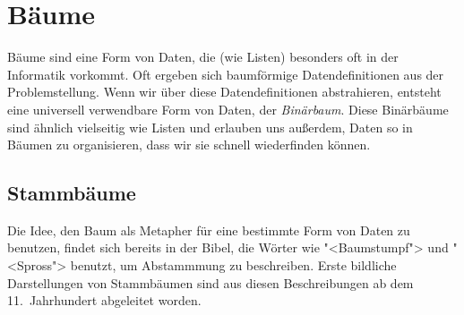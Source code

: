 
\chapter{Bäume}
\label{cha:trees}

Bäume sind eine Form von Daten, die (wie Listen) besonders
oft in der Informatik vorkommt.  Oft ergeben sich baumförmige
Datendefinitionen aus der Problemstellung.  Wenn wir über diese
Datendefinitionen abstrahieren, entsteht eine universell verwendbare
Form von Daten, der \textit{Binärbaum}.  Diese
Binärbäume sind ähnlich vielseitig wie Listen und erlauben uns
außerdem, Daten so in Bäumen zu organisieren, dass wir sie schnell
wiederfinden können.

\section{Stammbäume}

%
Die Idee, den Baum als Metapher für eine bestimmte Form von Daten zu
benutzen, findet sich bereits in der Bibel, die Wörter wie
"<Baumstumpf"> und "<Spross"> benutzt, um Abstammmung zu beschreiben.
Erste bildliche Darstellungen von Stammbäumen sind aus diesen
Beschreibungen ab dem 11.\ Jahrhundert abgeleitet worden.

